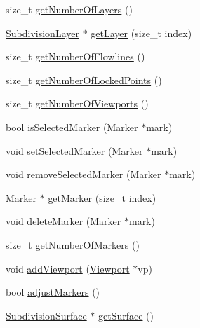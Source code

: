 \begin{DoxyCompactItemize}
size\-\_\-t \hyperlink{classShipCAD_1_1ShipCADModel_a414d6d3fcf43a81b06fa4ac3b4d5271c}{get\-Number\-Of\-Layers} ()
\item 
\hyperlink{classShipCAD_1_1SubdivisionLayer}{Subdivision\-Layer} $\ast$ \hyperlink{classShipCAD_1_1ShipCADModel_ae13e425deb59f7b4f0c95cc02230f097}{get\-Layer} (size\-\_\-t index)
\item 
size\-\_\-t \hyperlink{classShipCAD_1_1ShipCADModel_a40c755ae5132384cea686260c38b420d}{get\-Number\-Of\-Flowlines} ()
\item 
size\-\_\-t \hyperlink{classShipCAD_1_1ShipCADModel_aa0f6cd2d795408a877915f6c71241853}{get\-Number\-Of\-Locked\-Points} ()
\item 
size\-\_\-t \hyperlink{classShipCAD_1_1ShipCADModel_a9a1f4fc34ddd5ac3c3e90de6d1521f46}{get\-Number\-Of\-Viewports} ()
\item 
bool \hyperlink{classShipCAD_1_1ShipCADModel_a80076525a0aa65782988c3ddf97f37ce}{is\-Selected\-Marker} (\hyperlink{classShipCAD_1_1Marker}{Marker} $\ast$mark)
\item 
void \hyperlink{classShipCAD_1_1ShipCADModel_af638ed4ab8e64e89b0217cf727b48698}{set\-Selected\-Marker} (\hyperlink{classShipCAD_1_1Marker}{Marker} $\ast$mark)
\item 
void \hyperlink{classShipCAD_1_1ShipCADModel_a6801637e1f13a22b1ef3fc50e389f51e}{remove\-Selected\-Marker} (\hyperlink{classShipCAD_1_1Marker}{Marker} $\ast$mark)
\item 
\hyperlink{classShipCAD_1_1Marker}{Marker} $\ast$ \hyperlink{classShipCAD_1_1ShipCADModel_aedbe32ff0770186f6c565e2a978fcf14}{get\-Marker} (size\-\_\-t index)
\item 
void \hyperlink{classShipCAD_1_1ShipCADModel_a8c8e92902f8e90e77258c9a872e1dee8}{delete\-Marker} (\hyperlink{classShipCAD_1_1Marker}{Marker} $\ast$mark)
\item 
size\-\_\-t \hyperlink{classShipCAD_1_1ShipCADModel_a998b89ce2d09ff41318dc1b379c1740c}{get\-Number\-Of\-Markers} ()
\item 
void \hyperlink{classShipCAD_1_1ShipCADModel_a6d868bbb71f72c46e6827adeed8afc4b}{add\-Viewport} (\hyperlink{classShipCAD_1_1Viewport}{Viewport} $\ast$vp)
\item 
bool \hyperlink{classShipCAD_1_1ShipCADModel_aa4deb5e9df2dcebf4576e79520cb1b9e}{adjust\-Markers} ()
\item 
\hyperlink{classShipCAD_1_1SubdivisionSurface}{Subdivision\-Surface} $\ast$ \hyperlink{classShipCAD_1_1ShipCADModel_a6941ad7a2b167419e844823fa8461019}{get\-Surface} ()
\item 

\end{DoxyCompactItemize}
